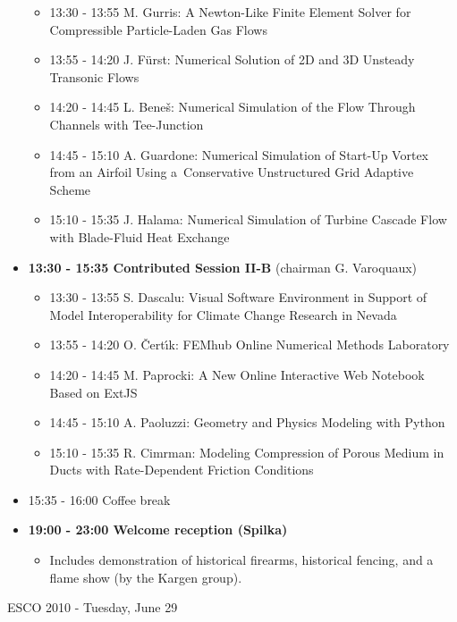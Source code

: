 \documentclass[10pt, A4]{article}%
\begin{document}
\begin{itemize}
\begin{itemize}
    \item 13:30 - 13:55 M. Gurris: A Newton-Like Finite Element Solver for Compressible Particle-Laden Gas Flows
    \item 13:55 - 14:20 J. F\"urst: Numerical Solution of 2D and 3D Unsteady Transonic Flows
    \item 14:20 - 14:45 L. Bene\v s: Numerical Simulation of the  Flow Through Channels with Tee-Junction
    \item 14:45 - 15:10 A. Guardone: Numerical Simulation of Start-Up Vortex from an Airfoil Using a~Conservative Unstructured Grid Adaptive Scheme
    \item 15:10 - 15:35 J. Halama: Numerical Simulation of Turbine Cascade Flow with Blade-Fluid Heat Exchange
  \end{itemize}
  \item {\bf 13:30 - 15:35 Contributed Session II-B} (chairman G. Varoquaux) 
  \begin{itemize}
    \item 13:30 - 13:55 S. Dascalu: Visual Software Environment in Support of Model Interoperability for Climate Change Research in Nevada
    \item 13:55 - 14:20 O. \v Cert\'{\i}k: FEMhub Online Numerical Methods Laboratory
    \item 14:20 - 14:45 M. Paprocki: A New  Online Interactive Web Notebook Based on ExtJS
    \item 14:45 - 15:10 A. Paoluzzi: Geometry and Physics Modeling with Python
    \item 15:10 - 15:35 R. Cimrman: Modeling Compression of Porous Medium in Ducts with Rate-Dependent Friction Conditions
  \end{itemize}
  \item 15:35 - 16:00 Coffee break
  \item {\bf 19:00 - 23:00 Welcome reception (Spilka)} 
  \begin{itemize}
     \item Includes demonstration of historical firearms, historical fencing, and a flame show (by the Kargen group).
  \end{itemize}
\end{itemize}

\newpage

\centerline{\huge ESCO 2010 - Tuesday, June 29}
\vspace{4mm}
\end{document}
